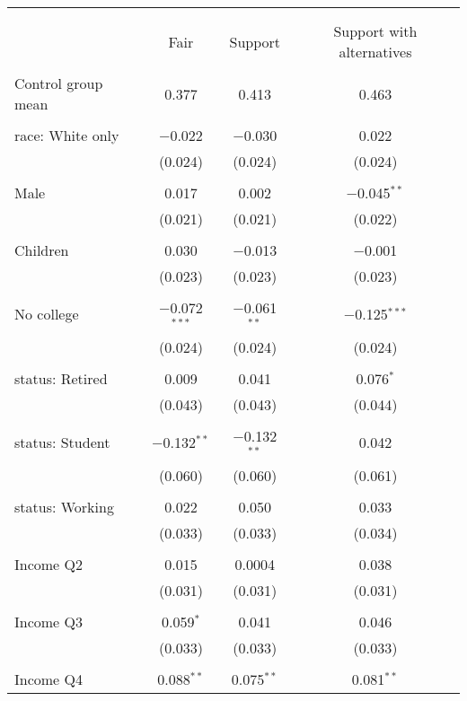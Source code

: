 
\begin{tabular}{@{\extracolsep{5pt}}lccc} 
\\[-1.8ex]\hline 
\hline \\[-1.8ex] 
\\[-1.8ex] & Fair & Support & Support with alternatives \\ 
\hline \\[-1.8ex] 
 Control group mean & 0.377 & 0.413 & 0.463  \\ \hline \\[-1.8ex] race: White only & $-$0.022 & $-$0.030 & 0.022 \\ 
  & (0.024) & (0.024) & (0.024) \\ 
  & & & \\ 
 Male & 0.017 & 0.002 & $-$0.045$^{**}$ \\ 
  & (0.021) & (0.021) & (0.022) \\ 
  & & & \\ 
 Children & 0.030 & $-$0.013 & $-$0.001 \\ 
  & (0.023) & (0.023) & (0.023) \\ 
  & & & \\ 
 No college & $-$0.072$^{***}$ & $-$0.061$^{**}$ & $-$0.125$^{***}$ \\ 
  & (0.024) & (0.024) & (0.024) \\ 
  & & & \\ 
 status: Retired & 0.009 & 0.041 & 0.076$^{*}$ \\ 
  & (0.043) & (0.043) & (0.044) \\ 
  & & & \\ 
 status: Student & $-$0.132$^{**}$ & $-$0.132$^{**}$ & 0.042 \\ 
  & (0.060) & (0.060) & (0.061) \\ 
  & & & \\ 
 status: Working & 0.022 & 0.050 & 0.033 \\ 
  & (0.033) & (0.033) & (0.034) \\ 
  & & & \\ 
 Income Q2 & 0.015 & 0.0004 & 0.038 \\ 
  & (0.031) & (0.031) & (0.031) \\ 
  & & & \\ 
 Income Q3 & 0.059$^{*}$ & 0.041 & 0.046 \\ 
  & (0.033) & (0.033) & (0.033) \\ 
  & & & \\ 
 Income Q4 & 0.088$^{**}$ & 0.075$^{**}$ & 0.081$^{**}$ \\ 

\end{tabular}
